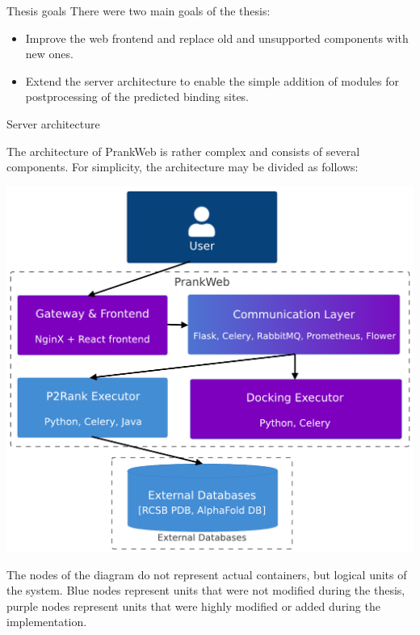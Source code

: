 \documentclass[portrait,a0paper,fontscale=0.25]{baposter}
\begin{document}
\begin{poster}
\begin{posterbox}[column=0, name=goals, below=intro, headerColorOne=cyan!60, boxColorOne=cyan!20]{Thesis goals}
There were two main goals of the thesis:
\begin{itemize}
\item Improve the web frontend and replace old and unsupported components with new ones.
\item Extend the server architecture to enable the simple addition of modules for postprocessing of the predicted
binding sites.
\end{itemize}
\end{posterbox}

\begin{posterbox}[column=0, name=architecture, below=goals]{Server architecture}

The architecture of PrankWeb is rather complex and consists of several components.
For simplicity, the architecture may be divided as follows:

\begin{center}
	\includegraphics[width=0.8\linewidth]{img/arch.pdf}
\end{center}

The nodes of the diagram do not represent actual containers, but logical units of the system. Blue nodes represent units that were not modified during the thesis, purple nodes represent units that were highly modified or added during the implementation.



\end{posterbox}
\end{poster}
\end{document}

